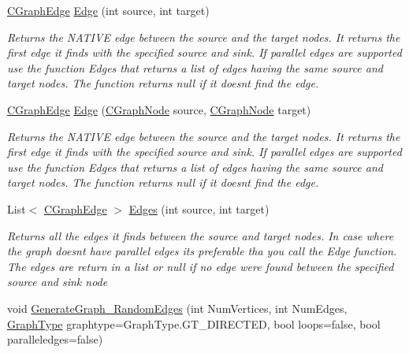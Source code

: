 \begin{DoxyCompactItemize}
\hyperlink{class_graph_library_1_1_c_graph_edge}{C\+Graph\+Edge} \hyperlink{class_graph_library_1_1_c_graph_a0aa4b87cbe9c0c8f9956ebc9d45f11f8}{Edge} (int source, int target)
\begin{DoxyCompactList}\small\item\em Returns the N\+A\+T\+I\+V\+E edge between the source and the target nodes. It returns the first edge it finds with the specified source and sink. If parallel edges are supported use the function Edges that returns a list of edges having the same source and target nodes. The function returns null if it doesn\textquotesingle{}t find the edge. \end{DoxyCompactList}\item 
\hyperlink{class_graph_library_1_1_c_graph_edge}{C\+Graph\+Edge} \hyperlink{class_graph_library_1_1_c_graph_a9a1acc1f91a1d8de411ee77d3826f996}{Edge} (\hyperlink{class_graph_library_1_1_c_graph_node}{C\+Graph\+Node} source, \hyperlink{class_graph_library_1_1_c_graph_node}{C\+Graph\+Node} target)
\begin{DoxyCompactList}\small\item\em Returns the N\+A\+T\+I\+V\+E edge between the source and the target nodes. It returns the first edge it finds with the specified source and sink. If parallel edges are supported use the function Edges that returns a list of edges having the same source and target nodes. The function returns null if it doesn\textquotesingle{}t find the edge. \end{DoxyCompactList}\item 
List$<$ \hyperlink{class_graph_library_1_1_c_graph_edge}{C\+Graph\+Edge} $>$ \hyperlink{class_graph_library_1_1_c_graph_a06c8ee25ece0294e50501796a1c22dd9}{Edges} (int source, int target)
\begin{DoxyCompactList}\small\item\em Returns all the edges it finds between the source and target nodes. In case where the graph doesn\textquotesingle{}t have parallel edges its preferable tha you call the Edge function. The edges are return in a list or null if no edge were found between the specified source and sink node \end{DoxyCompactList}\item 
void \hyperlink{class_graph_library_1_1_c_graph_a1585ebb9c26742a09b342a67a066e9ee}{Generate\+Graph\+\_\+\+Random\+Edges} (int Num\+Vertices, int Num\+Edges, \hyperlink{namespace_graph_library_1_1_generics_a1bac729ea88e6f3925406df33f15d056}{Graph\+Type} graphtype=Graph\+Type.\+G\+T\+\_\+\+D\+I\+R\+E\+C\+T\+E\+D, bool loops=false, bool paralleledges=false)

\end{DoxyCompactItemize}
